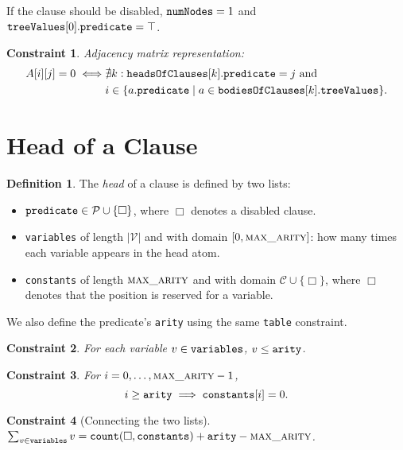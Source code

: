 \documentclass{article}
\newtheorem{constraint}{Constraint}
\theoremstyle{definition}
\newtheorem{definition}{Definition}
\newcommand{\variable}[1]{\texttt{\textup{#1}}}
\newcommand{\predicates}{\mathcal{P}}
\newcommand{\variables}{\mathcal{V}}
\newcommand{\constants}{\mathcal{C}}
\newcommand{\maxArity}{\textsc{max\_arity}}
\begin{document}
If the clause should be disabled, $\variable{numNodes} = 1$ and
$\variable{treeValues}[0].\variable{predicate} = \top$.

\begin{constraint}
  Adjacency matrix representation:
  \begin{align*}
    A[i][j] = 0 \iff &\nexists k: \variable{headsOfClauses}[k].\variable{predicate} = j \text{ and } \\
    &i \in \{ a.\variable{predicate} \mid a \in \variable{bodiesOfClauses}[k].\variable{treeValues} \}.
  \end{align*}
\end{constraint}

\section{Head of a Clause}

\begin{definition} %
  The \emph{head} of a clause is defined by two lists:
  \begin{itemize}
  \item $\variable{predicate} \in \predicates \cup \{ \Box \}$, where $\Box$
    denotes a disabled clause.
  \item \variable{variables} of length $|\variables{}|$ and with domain
    $[0, \maxArity{}]$: how many times each variable appears in the head atom.
  \item \variable{constants} of length $\maxArity{}$ and with domain
    $\constants{} \cup \{ \Box \}$, where $\Box$ denotes that the position is
    reserved for a variable.
  \end{itemize}
  We also define the predicate's \variable{arity} using the same
  \variable{table} constraint.
\end{definition}

\begin{constraint}
  For each variable $v \in \variable{variables}$, $v \le \variable{arity}$.
\end{constraint}

\begin{constraint}
  For $i = 0, \dots, \maxArity{} - 1$,
  \[
    i \ge \variable{arity} \implies \variable{constants}[i] = 0.
  \]
\end{constraint}

\begin{constraint}[Connecting the two lists]
  $\sum_{v \in \variable{variables}} v = \variable{count}(\Box,
  \variable{constants}) + \variable{arity} - \maxArity{}$.
\end{constraint}
\end{document}
